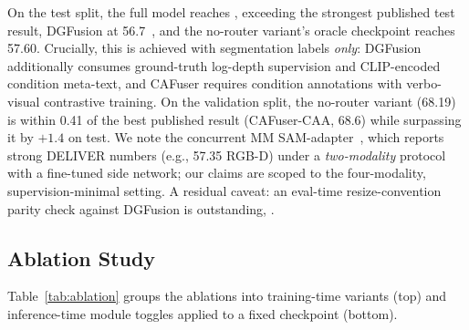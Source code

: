 On the test split, the full model reaches
, exceeding the strongest published test result,
DGFusion at 56.7~\cite{dgfusion2026}, and the no-router variant's
oracle checkpoint reaches 57.60. Crucially, this is achieved with
segmentation labels \emph{only}: DGFusion additionally consumes
ground-truth log-depth supervision and CLIP-encoded condition
meta-text, and CAFuser requires condition annotations with
verbo-visual contrastive training. On the validation split, the
no-router variant (68.19) is within 0.41 of the best published result
(CAFuser-CAA, 68.6) while surpassing it by $+1.4$ on test. We note the
concurrent MM SAM-adapter~\cite{mmsamadapter2025}, which reports
strong DELIVER numbers (e.g., 57.35 RGB-D) under a \emph{two-modality}
protocol with a fine-tuned side network; our claims are scoped to the
four-modality, supervision-minimal setting. A residual caveat: an
eval-time resize-convention parity check against DGFusion is
outstanding, .

\subsection{Ablation Study}
\label{sec:ablation}

Table~\ref{tab:ablation} groups the ablations into training-time
variants (top) and inference-time module toggles applied to a fixed
checkpoint (bottom).


